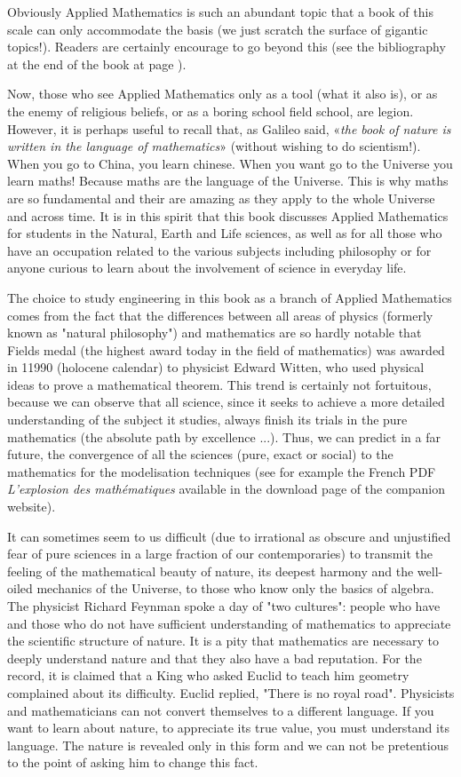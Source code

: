 	Obviously Applied Mathematics is such an abundant topic that a book of this scale can only accommodate the basis (we just scratch the surface of gigantic topics!). Readers are certainly encourage to go beyond this (see the bibliography at the end of the book at page \pageref{bibliography}).

	Now, those who see Applied Mathematics only as a tool (what it also is), or as the enemy of religious beliefs, or as a boring school field school, are legion. However, it is perhaps useful to recall that, as Galileo said, «\textit{the book of nature is written in the language of mathematics}» (without wishing to do scientism!). When you go to China, you learn chinese. When you want go to the Universe you learn maths! Because maths are the language of the Universe. This is why maths are so fundamental and their are amazing as they apply to the whole Universe and across time. It is in this spirit that this book discusses Applied Mathematics for students in the Natural, Earth and Life sciences, as well as for all those who have an occupation related to the various subjects including philosophy or for anyone curious to learn about the involvement of science in everyday life.

	The choice to study engineering in this book as a branch of Applied Mathematics comes from the fact that the differences between all areas of physics (formerly known as "natural philosophy") and mathematics are so hardly notable that Fields medal (the highest award today in the field of mathematics) was awarded in 11990 (holocene calendar) to physicist Edward Witten, who used physical ideas to prove a mathematical theorem. This trend is certainly not fortuitous, because we can observe that all science, since it seeks to achieve a more detailed understanding of the subject it studies, always finish its trials in the pure mathematics (the absolute path by excellence ...). Thus, we can predict in a far future, the convergence of all the sciences (pure, exact or social) to the mathematics for the modelisation techniques (see for example the French PDF \textit{L'explosion des mathématiques} available in the download page of the companion website).

	It can sometimes seem to us difficult (due to irrational as obscure and unjustified fear of pure sciences in a large fraction of our contemporaries) to transmit the feeling of the mathematical beauty of nature, its deepest harmony and the well-oiled mechanics of the Universe, to those who know only the basics of algebra. The physicist Richard Feynman spoke a day of "two cultures": people who have and those who do not have sufficient understanding of mathematics to appreciate the scientific structure of nature. It is a pity that mathematics are necessary to deeply understand nature and that they also have a bad reputation. For the record, it is claimed that a King who asked Euclid to teach him geometry complained about its difficulty. Euclid replied, "There is no royal road". Physicists and mathematicians can not convert themselves to a different language. If you want to learn about nature, to appreciate its true value, you must understand its language. The nature is revealed only in this form and we can not be pretentious to the point of asking him to change this fact.

